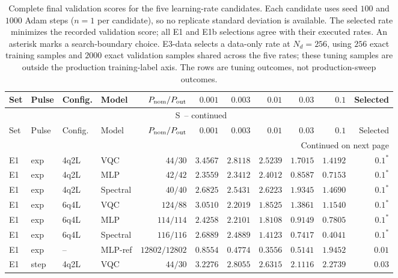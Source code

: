 \documentclass[11pt]{article}
\renewcommand{\thetable}{S\arabic{table}}
\begin{document}
\begingroup
\scriptsize
\setlength{\tabcolsep}{2.5pt}
\setlength{\LTcapwidth}{\textwidth}
\begin{longtable}{llllrrrrrrr}
\caption{Complete final validation scores for the five learning-rate candidates. Each candidate uses seed $100$ and $1000$ Adam steps ($n=1$ per candidate), so no replicate standard deviation is available. The selected rate minimizes the recorded validation score; all E1 and E1b selections agree with their executed rates. An asterisk marks a search-boundary choice. E3-data selects a data-only rate at $N_d=256$, using $256$ exact training
samples and $2000$ exact validation samples shared across the five rates;
these tuning samples are outside the production training-label axis.
The rows are tuning outcomes, not production-sweep outcomes.}\label{tab:lr-candidates}\\
\toprule
Set & Pulse & Config. & Model & $P_{\rm nom}/P_{\rm out}$ & $0.001$ & $0.003$ & $0.01$ & $0.03$ & $0.1$ & Selected \\
\midrule
\endfirsthead
\multicolumn{11}{c}{\tablename\ \thetable\ -- continued}\\
\toprule
Set & Pulse & Config. & Model & $P_{\rm nom}/P_{\rm out}$ & $0.001$ & $0.003$ & $0.01$ & $0.03$ & $0.1$ & Selected \\
\midrule
\endhead
\midrule
\multicolumn{11}{r}{Continued on next page}\\
\endfoot
\bottomrule
\endlastfoot
E1 & exp & 4q2L & VQC & $44/30$ & $3.4567$ & $2.8118$ & $2.5239$ & $1.7015$ & $1.4192$ & $0.1^{\ast}$ \\
E1 & exp & 4q2L & MLP & $42/42$ & $2.3559$ & $2.3412$ & $2.4012$ & $0.8587$ & $0.7153$ & $0.1^{\ast}$ \\
E1 & exp & 4q2L & Spectral & $40/40$ & $2.6825$ & $2.5431$ & $2.6223$ & $1.9345$ & $1.4690$ & $0.1^{\ast}$ \\
E1 & exp & 6q4L & VQC & $124/88$ & $3.0510$ & $2.2019$ & $1.8525$ & $1.3861$ & $1.1540$ & $0.1^{\ast}$ \\
E1 & exp & 6q4L & MLP & $114/114$ & $2.4258$ & $2.2101$ & $1.8108$ & $0.9149$ & $0.7805$ & $0.1^{\ast}$ \\
E1 & exp & 6q4L & Spectral & $116/116$ & $2.6889$ & $2.4889$ & $1.4123$ & $0.7417$ & $0.4041$ & $0.1^{\ast}$ \\
E1 & exp & -- & MLP-ref & $12802/12802$ & $0.8554$ & $0.4774$ & $0.3556$ & $0.5141$ & $1.9452$ & $0.01$ \\
E1 & step & 4q2L & VQC & $44/30$ & $3.2276$ & $2.8055$ & $2.6315$ & $2.1116$ & $2.2739$ & $0.03$ \\

\end{longtable}
\end{document}
